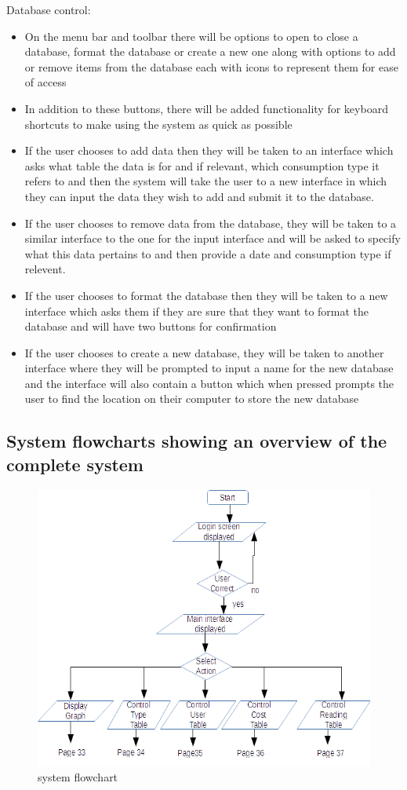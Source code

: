 Database control:
\begin{itemize}
\item{On the menu bar and toolbar there will be options to open to close a database, format the database  or create a new one along with options to add or remove items from the database each with icons to represent them for ease of access}
\item{In addition to these buttons, there will be added functionality for keyboard shortcuts to make using the system as quick as possible}
\item{If the user chooses to add data then they will be taken to an interface which asks what table the data is for and if relevant, which consumption type it refers to and then the system will take the user to a new interface in which they can input the data they wish to add and submit it to the database.}
\item{If the user chooses to remove data from the database, they will be taken to a similar interface to the one for the input interface and will be asked to specify what this data pertains to and then provide a date and consumption type if relevent.}
\item{If the user chooses to format the database then they will be taken to a new interface which asks them if they are sure that they want to format the database and will have two buttons for confirmation}
\item{If the user chooses to create a new database, they will be taken to another interface where they will be prompted to input a name for the new database and the interface will also contain a button which when pressed prompts the user to find the location on their computer to store the new database}
\end{itemize}

\subsection{System flowcharts showing an overview of the complete system}
\begin{figure}[H]
\includegraphics{./design/flowchart 1.png}
\caption{system flowchart}
\end{figure}

